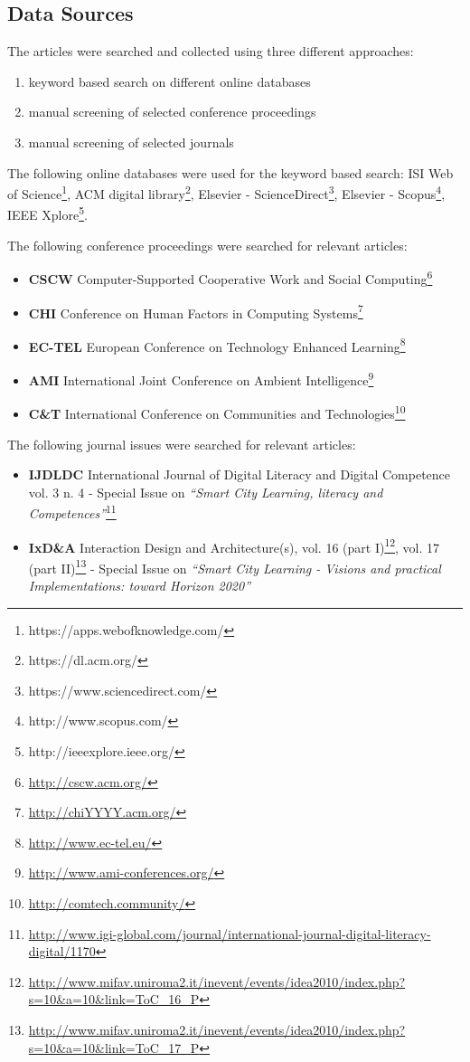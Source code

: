 \subsection{Data Sources}
The articles were searched and collected using three different approaches:

\begin{enumerate}
\item keyword based search on different online databases
\item manual screening of selected conference proceedings
\item manual screening of selected journals
\end{enumerate}

The following online databases were used for the keyword based search: ISI Web of Science\footnote{https://apps.webofknowledge.com/}, ACM digital library\footnote{https://dl.acm.org/}, Elsevier - ScienceDirect\footnote{https://www.sciencedirect.com/}, Elsevier - Scopus\footnote{http://www.scopus.com/}, IEEE Xplore\footnote{http://ieeexplore.ieee.org/}.

\medskip

The following conference proceedings were searched for relevant articles:
\begin{itemize}
\item \textbf{CSCW} Computer-Supported Cooperative Work and Social Computing\footnote{\url{http://cscw.acm.org/}}
\item \textbf{CHI} Conference on Human Factors in Computing Systems\footnote{\url{http://chiYYYY.acm.org/}}
\item \textbf{EC-TEL} European Conference on Technology Enhanced Learning\footnote{\url{http://www.ec-tel.eu/}}
\item \textbf{AMI} International Joint Conference on Ambient Intelligence\footnote{\url{http://www.ami-conferences.org/}}
\item \textbf{C\&T} International Conference on Communities and Technologies\footnote{\url{http://comtech.community/}}
\end{itemize}

The following journal issues were searched for relevant articles:
\begin{itemize}
\item \textbf{IJDLDC} International Journal of Digital Literacy and Digital Competence vol. 3 n. 4 - Special Issue on \textit{``Smart City Learning, literacy and Competences''}\footnote{\url{http://www.igi-global.com/journal/international-journal-digital-literacy-digital/1170}}
\item \textbf{IxD\&A} Interaction Design and Architecture(s), vol. 16 (part I)\footnote{\url{http://www.mifav.uniroma2.it/inevent/events/idea2010/index.php?s=10&a=10&link=ToC_16_P}}, vol. 17 (part II)\footnote{\url{http://www.mifav.uniroma2.it/inevent/events/idea2010/index.php?s=10&a=10&link=ToC_17_P}} - Special Issue on \textit{``Smart City Learning - Visions and practical Implementations: toward Horizon 2020''} 
\end{itemize}

